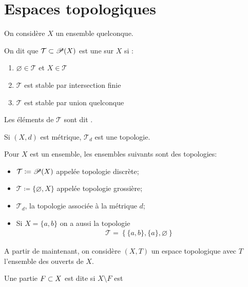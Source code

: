 \documentclass[french,a4paper,10pt]{article}
\begin{document}
	\section{Espaces topologiques}
	On considère $X$ un ensemble quelconque.
	
	\begin{definition}
		On dit que $\mathcal{T}\subset\mathscr{P}(X)$ est une  sur $X$ si :
		\begin{enumerate}[label=$(\roman*)$]
			\item $\varnothing\in \mathcal{T}$ et $X\in\mathcal{T}$
			
			\item $\mathcal{T}$ est stable par intersection finie
			
			\item $\mathcal{T}$ est stable par union quelconque
		\end{enumerate}
		Les éléments de $\mathcal{T}$ sont dit .
	\end{definition}
	
	\begin{myexample}
		Si $(X,d)$ est métrique, $\mathcal{T}_d$ est une topologie.
	\end{myexample}
	
	
	\begin{myexample}
		Pour $X$ est un ensemble, les ensembles suivants sont des topologies:
		\begin{itemize}
			\item $\mathcal{T} \coloneq \mathscr{P}(X)$ appelée topologie discrète;
			\item $\mathcal{T}\coloneq\{\varnothing, X\}$ appelée topologie grossière;
			\item $\mathcal{T}_d$, la topologie associée à la métrique $d$;
			\item Si $X=\{a,b\}$ on a aussi la topologie
			\[\begin{aligned}
				\mathcal{T}=\left\{\{a,b\}, \{a\}, \varnothing\right\}
			\end{aligned}\]
		\end{itemize}
	\end{myexample}
	
	
	
	A partir de maintenant, on considère $(X, T)$ un espace topologique avec $T$ l'ensemble des ouverts de $X$.
	
	\begin{definition}
		Une partie $F\subset X$ est dite  si $X\setminus F$ est \defemph{ouvert}
	\end{definition}
	
\end{document}
